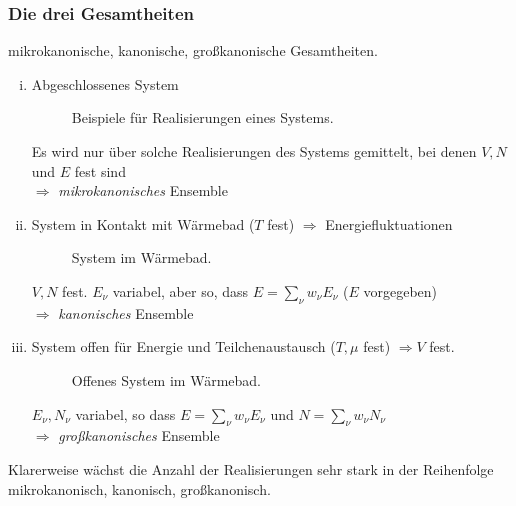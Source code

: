 \subsubsection{Die drei Gesamtheiten}
mikrokanonische, kanonische, großkanonische Gesamtheiten.
\begin{enumerate}[i)]
    \item Abgeschlossenes System
    \begin{figure}[H]
        \centering
        \def\svgwidth{0.9\textwidth}
        
        \caption{Beispiele für Realisierungen eines Systems.}
        \label{img:realisationsMKE}
\end{figure}
     Es wird nur über solche Realisierungen des Systems gemittelt, bei denen $V, N$ und $E$ fest sind \\
    $\Rightarrow$ \emph{mikrokanonisches} Ensemble
    \item System in Kontakt mit Wärmebad ($T$ fest) $\Rightarrow$ Energiefluktuationen
    \begin{figure}[H]
        \centering
        \def\svgwidth{0.5\textwidth}
        
        \caption{System im Wärmebad.}
        \label{img:systemInHeatBath}
\end{figure}
    $V, N$ fest. $E_\nu$ variabel, aber so, dass $E=\sum_\nu w_\nu E_\nu$ ($E$ vorgegeben) \\
    $\Rightarrow$ \emph{kanonisches} Ensemble
    \item System offen für Energie und Teilchenaustausch ($T, \mu$ fest) $\Rightarrow V$ fest.
    \begin{figure}[H]
        \centering
        \def\svgwidth{0.5\textwidth}
        
        \caption{Offenes System im Wärmebad.}
        \label{img:OpenSystemInHeatBath}
\end{figure}
    $E_\nu, N_\nu$ variabel, so dass $E=\sum_\nu w_\nu E_\nu$ und $N=\sum_\nu w_\nu N_\nu$ \\
    $\Rightarrow$ \emph{großkanonisches} Ensemble
\end{enumerate}
Klarerweise wächst die Anzahl der Realisierungen sehr stark in der Reihenfolge mikrokanonisch, kanonisch, großkanonisch.

